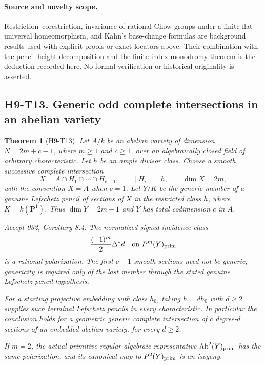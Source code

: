 \documentclass[11pt,a4paper]{article}
\newtheorem{theorem}{Theorem}[section]
\begin{document}
\paragraph{Source and novelty scope.}
Restriction--corestriction, invariance of rational Chow groups under a
finite flat universal homeomorphism, and Kahn's base-change formulas
are background results used with explicit proofs or exact locators
above. Their combination with the pencil height decomposition and
the finite-index monodromy theorem is the deduction recorded here.
No formal verification or historical originality is asserted.



\subsection*{H9-T13. Generic odd complete intersections in an abelian variety}

\begin{theorem}[H9-T13]
Let $A/k$ be an abelian variety of dimension
$N=2m+c-1$, where $m\ge1$ and $c\ge1$, over an algebraically closed
field of arbitrary characteristic. Let $h$ be an ample divisor class.
Choose a smooth successive complete intersection
\[
 X=A\cap H_1\cap\cdots\cap H_{c-1},\qquad [H_i]=h,
 \qquad \dim X=2m,
\]
with the convention $X=A$ when $c=1$. Let $Y/K$ be the generic member
of a genuine Lefschetz pencil of sections of $X$ in the restricted
class $h$, where $K=k(\mathbf P^1)$. Thus
$\dim Y=2m-1$ and $Y$ has total codimension $c$ in $A$.

Accept 032, Corollary 8.4. The normalized signed incidence class
\[
 \frac{(-1)^m}{2}\Delta^*d
       \quad\text{on }P^m(Y)_{\rm prim}
\]
is a rational polarization. The first $c-1$ smooth sections need not
be generic; genericity is required only of the last member through
the stated genuine Lefschetz-pencil hypothesis.

For a starting projective embedding with class $h_0$, taking
$h=d h_0$ with $d\ge2$ supplies such terminal Lefschetz pencils in
every characteristic. In particular the conclusion holds for a
geometric generic complete intersection of $c$ degree-$d$ sections
of an embedded abelian variety, for every $d\ge2$.

If $m=2$, the actual primitive regular algebraic representative
$\operatorname{Ab}^2(Y)_{\rm prim}$ has the same polarization, and
its canonical map to $P^2(Y)_{\rm prim}$ is an isogeny.
\end{theorem}
\end{document}
